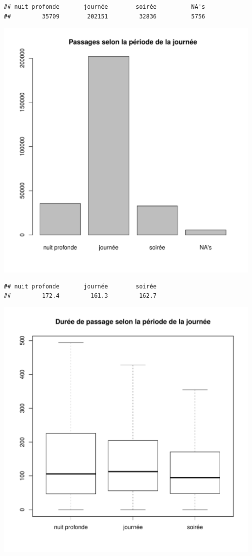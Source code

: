\documentclass[12pt,english,french,twoside]{report}\usepackage[]{graphicx}\usepackage[]{color}
\makeatletter
\def\maxwidth{ %
  \ifdim\Gin@nat@width>\linewidth
    \linewidth
  \else
    \Gin@nat@width
  \fi
}
\newenvironment{kframe}{%
 \def\at@end@of@kframe{}%
 \ifinner\ifhmode%
  \def\at@end@of@kframe{\end{minipage}}%
  \begin{minipage}{\columnwidth}%
 \fi\fi%
 \def\FrameCommand##1{\hskip\@totalleftmargin \hskip-\fboxsep
 \colorbox{shadecolor}{##1}\hskip-\fboxsep
     \hskip-\linewidth \hskip-\@totalleftmargin \hskip\columnwidth}%
 \MakeFramed {\advance\hsize-\width
   \@totalleftmargin\z@ \linewidth\hsize
   \@setminipage}}%
 {\par\unskip\endMakeFramed%
 \at@end@of@kframe}
\newenvironment{knitrout}{}{} %
\makeatother
\begin{document}
\begin{knitrout}
\color{fgcolor}\begin{kframe}
\begin{verbatim}
## nuit profonde       journée        soirée          NA's 
##         35709        202151         32836          5756
\end{verbatim}
\end{kframe}
\includegraphics[width=\maxwidth]{figure/duree_heure1} 
\begin{kframe}\begin{verbatim}
## nuit profonde       journée        soirée 
##         172.4         161.3         162.7
\end{verbatim}
\end{kframe}
\includegraphics[width=\maxwidth]{figure/duree_heure2} 

\end{knitrout}
\end{document}
